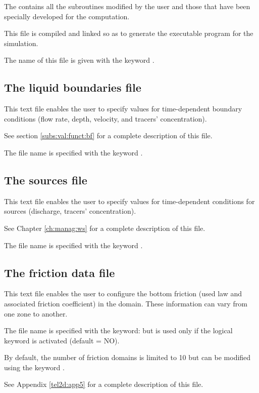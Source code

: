 The  contains all the  subroutines modified
by the user and those that have been specially developed for the computation.

This file is compiled and linked so as to generate the executable program
for the simulation.

The name of this file is given with the keyword .


\subsection{The liquid boundaries file}

This text file enables the user to specify values for time-dependent boundary
conditions (flow rate, depth, velocity, and tracers' concentration).

See section \ref{subs:val:funct:bf} for a complete description of this file.

The file name is specified with the keyword .


\subsection{The sources file}

This text file enables the user to specify values for time-dependent conditions
for sources (discharge, tracers' concentration).

See Chapter \ref{ch:manag:ws} for a complete description of this file.

The file name is specified with the keyword .


\subsection{The friction data file}

This text file enables the user to configure the bottom friction
(used law and associated friction coefficient) in the domain.
These information can vary from one zone to another.

The file name is specified with the keyword: 
but is used only if the logical keyword  is activated
(default = NO).

By default, the number of friction domains is limited to 10 but can be modified
using the keyword .

See Appendix \ref{tel2d:app5} for a complete description of this file.


